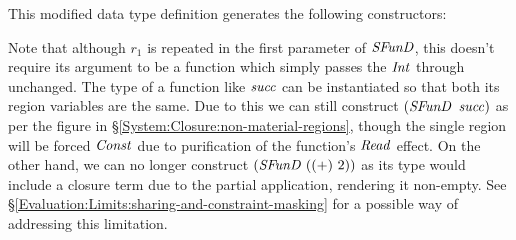 This modified data type definition generates the following constructors:


Note that although $r_1$ is repeated in the first parameter of $\operatorname{\mathit{SFunD}}$, this doesn't require its argument to be a function which simply passes the $\operatorname{\mathit{Int}}$ through unchanged. The type of a function like $\operatorname{\mathit{succ}}$ can be instantiated so that both its region variables are the same. Due to this we can still construct $(\iSFunD \ \isucc)$ as per the figure in \S\ref{System:Closure:non-material-regions}, though the single region will be forced $\operatorname{\mathit{Const}}$ due to purification of the function's $\operatorname{\mathit{Read}}$ effect. On the other hand, we can no longer construct $(\operatorname{\mathit{SFunD}} \ ((+) \ 2))$ as its type would include a closure term due to the partial application, rendering it non-empty. See \S\ref{Evaluation:Limits:sharing-and-constraint-masking}
 for a possible way of addressing this limitation.



